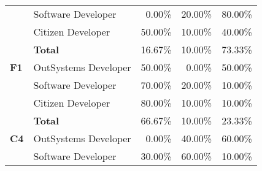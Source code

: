 \begin{table}[tb]
\begin{tabular}{@{}llrrr@{}}
                              & Software Developer   & 0.00\%                                                            & 20.00\%                                                                 & 80.00\%                                                       \\
                              & Citizen Developer    & 50.00\%                                                           & 10.00\%                                                                 & 40.00\%                                                       \\
                              & \textbf{Total}       & 16.67\%                                                           & 10.00\%                                                                  & 73.33\%                                                       \\ \midrule
    \textbf{F1}               & OutSystems Developer & 50.00\%                                                           & 0.00\%                                                                  & 50.00\%                                                       \\
                              & Software Developer   & 70.00\%                                                           & 20.00\%                                                                 & 10.00\%                                                       \\
                              & Citizen Developer    & 80.00\%                                                           & 10.00\%                                                                 & 10.00\%                                                       \\
                              & \textbf{Total}       & 66.67\%                                                           & 10.00\%                                                                  & 23.33\%                                                       \\ \midrule
    \textbf{C4}               & OutSystems Developer & 0.00\%                                                            & 40.00\%                                                                 & 60.00\%                                                       \\
                              & Software Developer   & 30.00\%                                                           & 60.00\%                                                                 & 10.00\%                                                       \\

\end{tabular}
\end{table}
